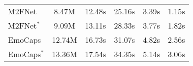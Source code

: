 {{\begin{table*}[htbp]
{\begin{tabular}{l|ccccc}
			M2FNet \cite{chudasama2022m2fnet}                  & 8.47M                   & 12.48s       & 25.16s       & 3.39s        & 1.15s        \\
			M2FNet$^\ast$                   & 9.09M                   & 13.11s       & 28.33s       & 3.77s        & 1.82s        \\ \hline
			EmoCaps \cite{li2022emocaps}                 & 12.74M                  & 16.73s       & 31.07s       & 4.82s        & 2.56s        \\
			EmoCaps$^\ast$                  & 13.36M                  & 17.54s       & 34.35s       & 5.14s        & 3.06s        \\ \hline
	\end{tabular}}
\end{table*}

\begin{table*}[htbp]
	

\end{table*}}}
